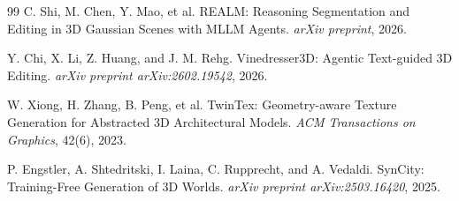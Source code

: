 \begin{thebibliography}{99}
C. Shi, M. Chen, Y. Mao, et al.
\newblock REALM: Reasoning Segmentation and Editing in 3D Gaussian Scenes with MLLM Agents.
\newblock \emph{arXiv preprint}, 2026.

Y. Chi, X. Li, Z. Huang, and J. M. Rehg.
\newblock Vinedresser3D: Agentic Text-guided 3D Editing.
\newblock \emph{arXiv preprint arXiv:2602.19542}, 2026.

W. Xiong, H. Zhang, B. Peng, et al.
\newblock TwinTex: Geometry-aware Texture Generation for Abstracted 3D Architectural Models.
\newblock \emph{ACM Transactions on Graphics}, 42(6), 2023.

P. Engstler, A. Shtedritski, I. Laina, C. Rupprecht, and A. Vedaldi.
\newblock SynCity: Training-Free Generation of 3D Worlds.
\newblock \emph{arXiv preprint arXiv:2503.16420}, 2025.

\end{thebibliography}
